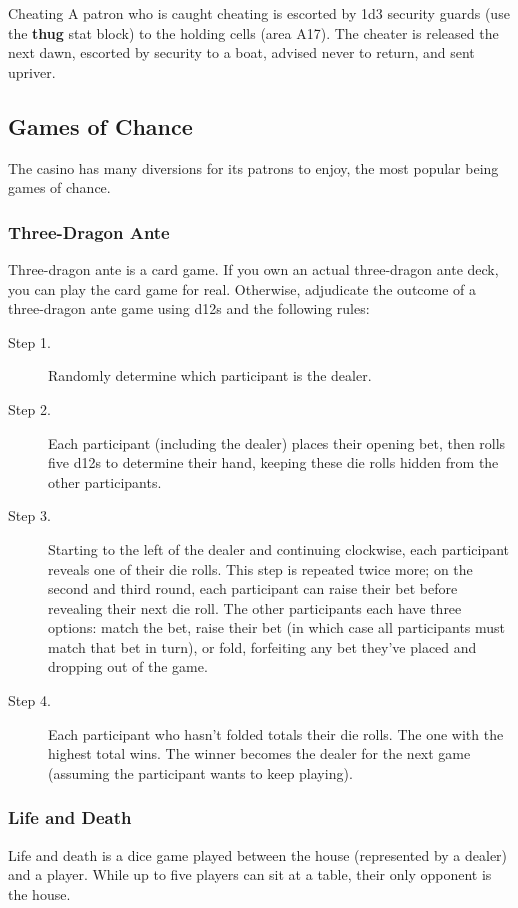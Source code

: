 \documentclass[10pt,a4paper,twoside,bg=print,twocolumn,openany,nodeprecatedcode]{dndbook}
\begin{document}
\begin{DndSidebar}[float=!b]{Cheating}
A patron who is caught cheating is escorted by 1d3 security guards (use the \textbf{thug} stat block) to the holding cells (area A17). The cheater is released the next dawn, escorted by security to a boat, advised never to return, and sent upriver.



\end{DndSidebar}

\subsection{Games of Chance}
The casino has many diversions for its patrons to enjoy, the most popular being games of chance.

\subsubsection{Three-Dragon Ante}
Three-dragon ante is a card game. If you own an actual three-dragon ante deck, you can play the card game for real. Otherwise, adjudicate the outcome of a three-dragon ante game using d12s and the following rules:


\begin{description}
\item[Step 1.]
Randomly determine which participant is the dealer.
\item[Step 2.]
Each participant (including the dealer) places their opening bet, then rolls five d12s to determine their hand, keeping these die rolls hidden from the other participants.
\item[Step 3.]
Starting to the left of the dealer and continuing clockwise, each participant reveals one of their die rolls. This step is repeated twice more; on the second and third round, each participant can raise their bet before revealing their next die roll. The other participants each have three options: match the bet, raise their bet (in which case all participants must match that bet in turn), or fold, forfeiting any bet they've placed and dropping out of the game.
\item[Step 4.]
Each participant who hasn't folded totals their die rolls. The one with the highest total wins. The winner becomes the dealer for the next game (assuming the participant wants to keep playing).
\end{description}

\subsubsection{Life and Death}
Life and death is a dice game played between the house (represented by a dealer) and a player. While up to five players can sit at a table, their only opponent is the house.
\end{document}
